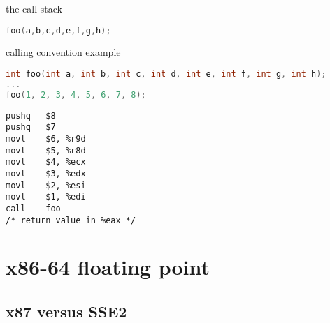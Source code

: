 \begin{frame}[fragile,label=callStack]{the call stack}
\begin{lstlisting}[language=C,style=small]
foo(a,b,c,d,e,f,g,h);
\end{lstlisting}
\end{frame}

\begin{frame}[fragile,label=conventionEx]{calling convention example}
\begin{lstlisting}[language=C,style=small]
int foo(int a, int b, int c, int d, int e, int f, int g, int h);
...
foo(1, 2, 3, 4, 5, 6, 7, 8);
\end{lstlisting}
\begin{lstlisting}[language=myasm,style=small]
pushq   $8
pushq   $7
movl    $6, %r9d
movl    $5, %r8d
movl    $4, %ecx
movl    $3, %edx
movl    $2, %esi
movl    $1, %edi
call    foo
/* return value in %eax */
\end{lstlisting}
\end{frame}

\section{x86-64 floating point}

\subsection{x87 versus SSE2}

